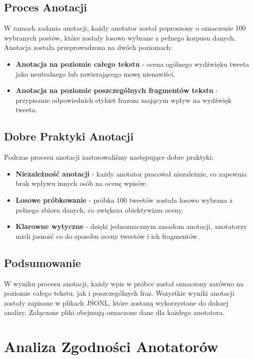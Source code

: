 \documentclass[12pt]{article}
\begin{document}
\subsection{Proces Anotacji}
W ramach zadania anotacji, każdy anotator został poproszony o oznaczenie 100 wybranych postów, które zostały losowo wybrane z pełnego korpusu danych. Anotacja została przeprowadzona na dwóch poziomach:
\begin{itemize}
    \item \textbf{Anotacja na poziomie całego tekstu} - ocena ogólnego wydźwięku tweeta jako neutralnego lub zawierającego mowę nienawiści.
    \item \textbf{Anotacja na poziomie poszczególnych fragmentów tekstu} - przypisanie odpowiednich etykiet frazom mającym wpływ na wydźwięk tweeta.
\end{itemize}

\subsection{Dobre Praktyki Anotacji}
Podczas procesu anotacji zastosowaliśmy następujące dobre praktyki:
\begin{itemize}
    \item \textbf{Niezależność anotacji} - każdy anotator pracował niezależnie, co zapewnia brak wpływu innych osób na ocenę wpisów.
    \item \textbf{Losowe próbkowanie} - próbka 100 tweetów została losowo wybrana z pełnego zbioru danych, co zwiększa obiektywizm oceny.
    \item \textbf{Klarowne wytyczne} - dzięki jednoznacznym zasadom anotacji, anotatorzy mieli jasność co do sposobu oceny tweetów i ich fragmentów.
\end{itemize}

\subsection{Podsumowanie}
W wyniku procesu anotacji, każdy wpis w próbce został oznaczony zarówno na poziomie całego tekstu, jak i poszczególnych fraz. Wszystkie wyniki anotacji zostały zapisane w plikach JSONL, które zostaną wykorzystane do dalszej analizy. Załączone pliki obejmują oznaczone dane dla każdego anotatora.

\section{Analiza Zgodności Anotatorów}
\end{document}
